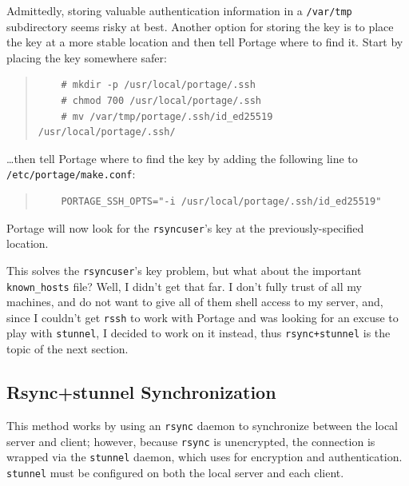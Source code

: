 \documentclass{article}
\begin{document}
Admittedly, storing valuable authentication information in a \texttt{/var/tmp} subdirectory seems risky at best.  Another option for storing the key is to place the key at a more stable location and then tell Portage where to find it.  Start by placing the key somewhere safer:
\begin{quote}
\begin{verbatim}
	# mkdir -p /usr/local/portage/.ssh
	# chmod 700 /usr/local/portage/.ssh
	# mv /var/tmp/portage/.ssh/id_ed25519 /usr/local/portage/.ssh/
\end{verbatim}
\end{quote}
\ldots then tell Portage where to find the key by adding the following line to \texttt{/etc/portage/make.conf}:
\begin{quote}
\begin{verbatim}
	PORTAGE_SSH_OPTS="-i /usr/local/portage/.ssh/id_ed25519"
\end{verbatim}
\end{quote}
Portage will now look for the \texttt{rsyncuser}'s key at the previously-specified location.

This solves the \texttt{rsyncuser}'s key problem, but what about the important \texttt{known_hosts} file?  Well, I didn't get that far.  I don't fully trust of all my machines, and do not want to give all of them shell access to my server, and, since I couldn't get \texttt{rssh} to work with Portage and was looking for an excuse to play with \texttt{stunnel}, I decided to work on it instead, thus \texttt{rsync+stunnel} is the topic of the next section.

\subsection{Rsync+stunnel Synchronization}
This method works by using an \texttt{rsync} daemon to synchronize between the local server and client; however, because \texttt{rsync} is unencrypted, the connection is wrapped via the \texttt{stunnel} daemon, which uses  for encryption and authentication.  \texttt{stunnel} must be configured on both the local server and each client.
\end{document}
